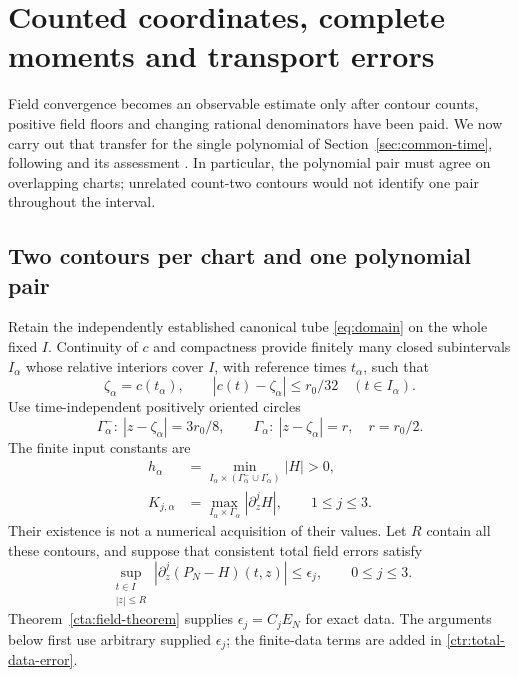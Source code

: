 \section{Counted coordinates, complete moments and transport errors}
\label{sec:counted-transfer}

Field convergence becomes an observable estimate only after contour
counts, positive field floors and changing rational denominators have
been paid. We now carry out that transfer for the single polynomial of
Section~\ref{sec:common-time}, following \cite{BakerCM48} and its
assessment \cite{BakerCMReview40}. In particular, the polynomial pair
must agree on overlapping charts; unrelated count-two contours would
not identify one pair throughout the interval.

\subsection{Two contours per chart and one polynomial pair}

Retain the independently established canonical tube
\eqref{eq:domain} on the whole fixed $I$. Continuity of $c$ and
compactness provide finitely many closed subintervals $I_\alpha$ whose
relative interiors cover $I$, with reference times $t_\alpha$, such that
\begin{equation}
 \zeta_\alpha=c(t_\alpha),\qquad
 |c(t)-\zeta_\alpha|\le r_0/32\quad(t\in I_\alpha).
 \label{ctr:chart-drift}
\end{equation}
Use time-independent positively oriented circles
\begin{equation}
 \Gamma_\alpha^-:\ |z-\zeta_\alpha|=3r_0/8,
 \qquad
 \Gamma_\alpha:\ |z-\zeta_\alpha|=r,\quad r=r_0/2.
 \label{ctr:two-circles}
\end{equation}
The finite input constants are
\begin{equation}
 \begin{split}
 h_\alpha&=\min_{I_\alpha\times(\Gamma_\alpha^-\cup\Gamma_\alpha)}|H|>0,\\
 K_{j,\alpha}&=\max_{I_\alpha\times\Gamma_\alpha}|\partial_z^jH|,
                       \qquad 1\le j\le3.
 \end{split}
 \label{ctr:contour-inputs}
\end{equation}
Their existence is not a numerical acquisition of their values.
Let $R$ contain all these contours, and suppose that consistent total
field errors satisfy
\begin{equation}
 \sup_{\substack{t\in I\\|z|\le R}}
 |\partial_z^j(P_N-H)(t,z)|\le\epsilon_j,
                       \qquad 0\le j\le3.
 \label{ctr:field-interface}
\end{equation}
Theorem~\ref{cta:field-theorem} supplies $\epsilon_j=C_jE_N$ for exact
data. The arguments below first use arbitrary supplied $\epsilon_j$;
the finite-data terms are added in \eqref{ctr:total-data-error}.

